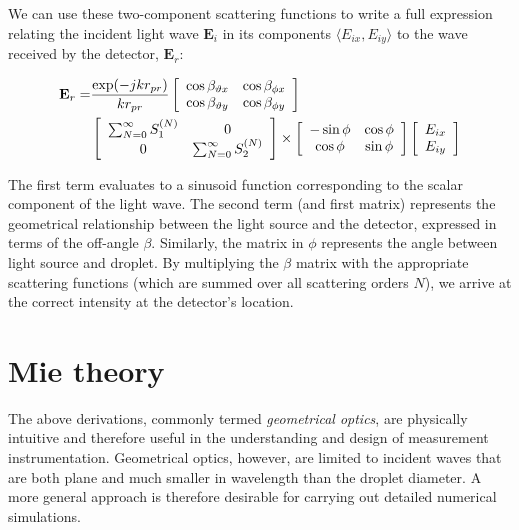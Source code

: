 \documentclass[11.5pt]{book}
\begin{document}
We can use these two-component scattering functions to write a full expression
relating the incident light wave $\mathbf{E}_i$ in its components $\langle E_{ix},
E_{iy} \rangle$ to the wave received by the detector, $\mathbf{E}_r$:

\begin{align}
    \label{eq:fulltransfer}
    {\bf E}_r = &\frac{\exp(-j k r_{pr})}{k r_{pr}}
    \left[ \begin{array}{c c}\cos \beta_{\vartheta x} & \cos \beta_{\phi x} \\
            \cos \beta_{\vartheta y} & \cos \beta_{\phi y} \end{array} \right]
    \\
    &\left[ \begin{array}{c c} \sum_{N=0}^{\infty} S_1^{(N)} & 0 \\
    0 & \sum_{N=0}^{\infty} S_2^{(N)}
  \end{array} \right] \times
\left[ \begin{array}{c c} -\sin \phi & \cos \phi \\ \cos \phi & \sin \phi \end{array} \right]
\left[ \begin{array}{c} E_{ix} \\ E_{iy} \end{array} \right]
\end{align}

The first term evaluates to a sinusoid function corresponding to the scalar
component of the light wave. The second term (and first matrix) represents the
geometrical relationship between the light source and the detector, expressed in
terms of the off-angle $\beta$. Similarly, the matrix in $\phi$ represents the
angle between light source and droplet. By multiplying the $\beta$ matrix with
the appropriate scattering functions (which are summed over all scattering
orders $N$), we arrive at the correct intensity at the detector's location.

\section{Mie theory}
The above derivations, commonly termed \emph{geometrical
optics}, are physically intuitive and therefore useful in the understanding and
design of measurement instrumentation. Geometrical optics, however, are limited
to incident waves that are both plane and much smaller in wavelength than the
droplet diameter. A more general approach is therefore desirable for carrying
out detailed numerical simulations.
\end{document}
